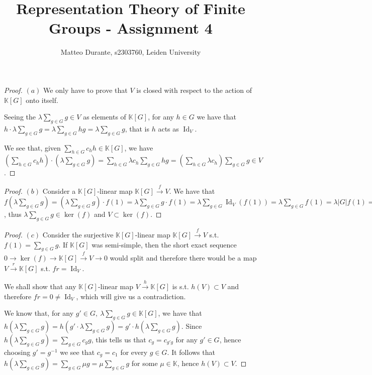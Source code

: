 \documentclass{article}
\newcommand{\numberset}{\mathbb}
\newcommand{\K}{\numberset{K}}
\newcommand{\exercise}[1]{\noindent {\bf Exercise #1}}
\DeclareMathOperator{\Id}{Id}
\begin{document}
\title{Representation Theory of Finite Groups - Assignment 4}

\author{Matteo Durante, s2303760, Leiden University}

\maketitle

\exercise{7.1}

\begin{proof}
    $(a)$ We only have to prove that $V$ is closed with respect to the action of
    $\K[G]$ onto itself.

    Seeing the $\lambda\sum_{g\in G}g\in V$ as elements of $\K[G]$, for any
    $h\in G$ we have that $h\cdot\lambda\sum_{g\in G}g=\lambda\sum_{g\in
    G}hg=\lambda\sum_{g\in G} g$, that is $h$ acts as $\Id_V$.
    
    We see that, given $\sum_{h\in G}c_hh\in\K[G]$, we have $(\sum_{h\in
    G}c_hh)\cdot(\lambda\sum_{g\in G}g)=\sum_{h\in G}\lambda c_h\sum_{g\in G}hg
    =(\sum_{h\in G}\lambda c_h)\sum_{g\in G}g\in V$.
\end{proof}

\begin{proof}
    $(b)$ Consider a $\K[G]$-linear map $\K[G]\xrightarrow{f}V$. We have that
    $f(\lambda\sum_{g\in G}g)=(\lambda\sum_{g\in G}g)\cdot
    f(1)=\lambda\sum_{g\in G}g\cdot f(1)=\lambda\sum_{g\in G}\Id_V(f(1))=
    \lambda\sum_{g\in G}f(1)=\lambda|G|f(1)=0$, thus $\lambda\sum_{g\in G}g\in
    \ker(f)$ and $V\subset\ker(f)$.
\end{proof}

\begin{proof}
    $(c)$ Consider the surjective $\K[G]$-linear map $\K[G]\xrightarrow{f}V$
    s.t. $f(1)=\sum_{g\in G}g$. If $\K[G]$ was semi-simple, then the short exact
    sequence $0\rightarrow\ker(f)\rightarrow\K[G]\xrightarrow{f}V\rightarrow 0$
    would split and therefore there would be a map $V\xrightarrow{r}\K[G]$ s.t.
    $fr=\Id_V$.

    We shall show that any $\K[G]$-linear map $V\xrightarrow{h}\K[G]$ is s.t.
    $h(V)\subset V$ and therefore $fr=0\neq\Id_V$, which will give us a
    contradiction.

    We know that, for any $g'\in G,\ \lambda\sum_{g\in G}g\in\K[G]$, we have
    that $h(\lambda\sum_{g\in G}g)=h(g'\cdot\lambda\sum_{g\in
    G}g)=g'\cdot h(\lambda\sum_{g\in G}g)$. Since
    $h(\lambda\sum_{g\in G}g)=\sum_{g\in G}c_gg$, this
    tells us that $c_g=c_{g'g}$ for any $g'\in G$, hence choosing $g'=g^{-1}$
    we see that $c_g=c_1$ for every $g\in G$. It follows that
    $h(\lambda\sum_{g\in G}g)=\sum_{g\in G}\mu g=\mu\sum_{g\in G}g$ for some
    $\mu\in\K$, hence $h(V)\subset V$.
\end{proof}
\end{document}
